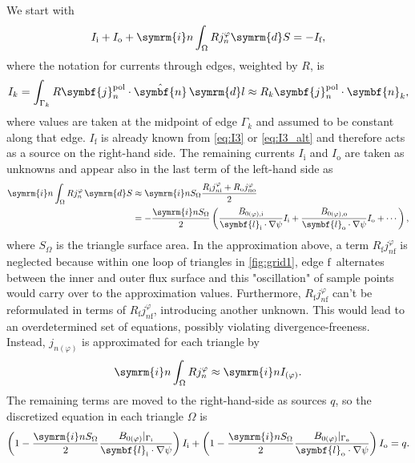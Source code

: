 \documentclass[a4paper, 10pt, english]{article}
\let\temp\vartheta
\let\vartheta\theta
\let\theta\temp
\let\temp\varphi
\let\varphi\phi
\let\phi\temp
\let\vec\symbf
\newcommand*\diff{\ensuremath{\symrm{d}}}  %
\newcommand*\im{\ensuremath{\symrm{i}}}  %
\newcommand*\pol{\ensuremath{\textrm{pol}}}  %
\newcommand*\fs{\ensuremath{\textrm{f}}}  %
\newcommand*\inw{\ensuremath{\textrm{i}}}  %
\newcommand*\out{\ensuremath{\textrm{o}}}  %
\begin{document}
We start with
\begin{gather}
  I_{\inw} + I_{\out} + \im n \int_{\Omega} R j_{n}^{\phi} \diff S = -I_{\fs},
\end{gather}
where the notation for currents through edges, weighted by $R$, is
\begin{gather}
  I_{k} = \int_{\Gamma_{k}} R \vec{j}_{n}^{\pol} \cdot \hat{\vec{n}} \, \diff l \approx R_{k} \vec{j}_{n}^{\pol} \cdot \vec{n}_{k},
\end{gather}
where values are taken at the midpoint of edge $\Gamma_{k}$ and assumed to be constant along that edge. $I_{\fs}$ is already known from \cref{eq:I3} or \cref{eq:I3_alt}
and therefore acts as a source on the right-hand side. The remaining currents $I_{\inw}$ and $I_{\out}$ are taken as unknowns and appear also in the last term of the left-hand side as
\begin{align}
  \im n \int_{\Omega} R j_{n}^{\phi} \, \diff S & \approx \im n S_{\Omega} \frac{R_{\inw} j_{n \inw}^{\phi} + R_{\out} j_{n \out}^{\phi}}{2} \nonumber \\
  &= -\frac{\im n S_{\Omega}}{2} \left( \frac{B_{0 (\phi), \inw}}{\vec{l}_{\inw} \cdot \nabla \psi} I_{\inw} + \frac{B_{0 (\phi), \out}}{\vec{l}_{\out} \cdot \nabla \psi} I_{\out} + \dotsb \right),
\end{align}
where $S_{\Omega}$ is the triangle surface area. In the approximation above, a term $R_{\fs} j_{n \fs}^{\phi}$ is neglected because within one loop of triangles in \cref{fig:grid1}, edge \fs\ alternates between the inner and outer flux surface and this "oscillation" of sample points would carry over to the approximation values. Furthermore, $R_{\fs} j_{n \fs}^{\phi}$ can't be reformulated in terms of $R_{\fs} j_{n \fs}^{\phi}$, introducing another unknown. This would lead to an overdetermined set of equations, possibly violating divergence-freeness. Instead, $j_{n (\phi)}$ is approximated for each triangle by
\begin{gather}
  \im n \int_{\Omega} R j_{n}^{\phi} \approx \im n I_{(\phi)}.
\end{gather}
The remaining terms are moved to the right-hand-side as sources $q$, so the discretized equation in each triangle $\Omega$ is
\begin{gather}
  \left( 1 - \frac{\im n S_{\Omega}}{2} \frac{B_{0 (\phi)} \vert_{\Gamma_{\inw}}}{\vec{l}_{\inw} \cdot \nabla \psi} \right) I_{\inw} + \left( 1 - \frac{\im n S_{\Omega}}{2} \frac{B_{0 (\phi)} \vert_{\Gamma_{\out}}}{\vec{l}_{\out} \cdot \nabla \psi} \right) I_{\out} = q. \label{eq:I1I2}
\end{gather}
\end{document}
